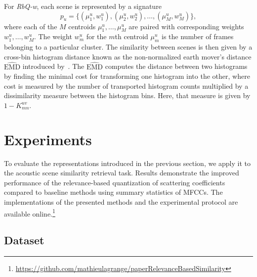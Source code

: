 \documentclass[smallextended]{svjour3}
\newcommand*{\EMD}{\mathrm{EMD}}
\begin{document}
For \emph{RbQ-w}, each scene is represented by a signature
$$
p_u = \lbrace(\mu_1^u,w_1^u),(\mu_2^u,w_2^u),\ldots,(\mu_M^u,w_M^u)\rbrace,
$$
where each of the $M$ centroids $\mu_1^u, \ldots, \mu_M^u$ are paired with corresponding weights $w_1^u, \ldots, w_M^u$. The weight $w_m^u$ for the $m$th centroid $\mu_m^u$ is the number of frames belonging to a particular cluster. The similarity between scenes is then given by a cross-bin histogram distance known as the non-normalized earth mover's distance $\widehat{\EMD}$ introduced by~\cite{pele2008linear}. The $\widehat{\EMD}$ computes the distance between two histograms by finding the minimal cost for transforming one histogram into the other, where cost is measured by the number of transported histogram counts multiplied by a dissimilarity measure between the histogram bins. Here, that measure is given by $1-K_{mn}^{uv}$.

\section{Experiments}
\label{sec:experiments}

To evaluate the representations introduced in the previous section, we apply it to the acoustic scene similarity retrieval task.
Results demonstrate the improved performance of the relevance-based quantization of scattering coefficients compared to baseline methods using summary statistics of MFCCs.
The implementations of the presented methods and the experimental protocol are available online.\footnote{\url{https://github.com/mathieulagrange/paperRelevanceBasedSimilarity}}

\subsection{Dataset}
\end{document}
